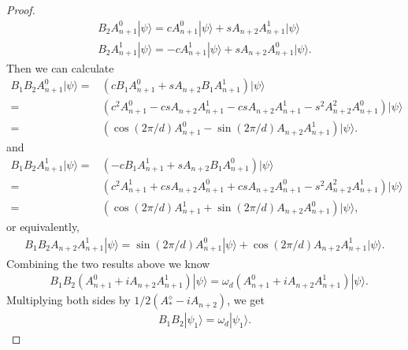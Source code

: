 \documentclass[11pt,letterpaper]{article}
\newcommand{\ket}[1]{|#1\rangle}
\newcommand{\1}{\mathbb{1}}
\theoremstyle{definition}
\begin{document}
\begin{proof}
\begin{align}
        		B_2A_{n+1}^0 \ket{\psi} = cA_{n+1}^0\ket{\psi} + sA_{n+2}A_{n+1}^1\ket{\psi}\\
        		B_2A_{n+1}^1 \ket{\psi} = -cA_{n+1}^1\ket{\psi} + sA_{n+2}A_{n+1}^0\ket{\psi}.
        \end{align}
        Then we can calculate
        \begin{align}
        		B_1B_2 A_{n+1}^0 \ket{\psi} =& (c B_1A_{n+1}^0 +sA_{n+2}B_1A_{n+1}^1)\ket{\psi}\\
        		=&(c^2A_{n+1}^0- csA_{n+2}A_{n+1}^1 -csA_{n+2}A_{n+1}^1 -s^2 A_{n+2}^2 A_{n+1}^0)\ket{\psi}\\
        		=& (\cos(2\pi/d) A_{n+1}^0 - \sin(2\pi/d) A_{n+2}A_{n+1}^1)\ket{\psi}.
        \end{align}
        and 
        \begin{align}
        		B_1B_2 A_{n+1}^1 \ket{\psi} =& (-c B_1A_{n+1}^1 +sA_{n+2}B_1A_{n+1}^0)\ket{\psi}\\
        		=&(c^2A_{n+1}^1+ csA_{n+2}A_{n+1}^0 +csA_{n+2}A_{n+1}^0 -s^2 A_{n+2}^2 A_{n+1}^1)\ket{\psi}\\
        		=& (\cos(2\pi/d) A_{n+1}^1 + \sin(2\pi/d) A_{n+2}A_{n+1}^0)\ket{\psi},
        \end{align}
        or equivalently,
        \begin{align}
        		B_1B_2 A_{n+2}A_{n+1}^1 \ket{\psi} = \sin(2\pi/d) A_{n+1}^0\ket{\psi} + \cos(2\pi/d)A_{n+2}A_{n+1}^1\ket{\psi}.
        \end{align}
        Combining the two results above we know
	\begin{align}
		\label{eq:omegad}&B_1B_2 (A_{n+1}^0 + i A_{n+2}A_{n+1}^1) \ket{\psi} =\omega_d(A_{n+1}^0 + iA_{n+2}A_{n+1}^1) \ket{\psi}.
	\end{align}
	Multiplying both sides by $1/2(A_\ast^\diamond - iA_{n+2})$, we get
	\begin{align}
		B_1B_2 \ket{\psi_1} = \omega_d\ket{\psi_1}.
	\end{align}
	

\end{proof}
\end{document}
